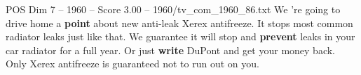\begin{textsample}{POS Dim 7 – 1960 – Score 3.00 – 1960/tv\_com\_1960\_86.txt}  \label{ex:f7_pos_025}
We 're going to drive home a \textbf{point} about new anti-leak Xerex antifreeze.
It stops most common radiator leaks just like that.
We guarantee it will stop and \textbf{prevent} leaks in your car radiator for a full year.
Or just \textbf{write} DuPont and get your money back.
Only Xerex antifreeze is guaranteed not to run out on you.

\end{textsample}
